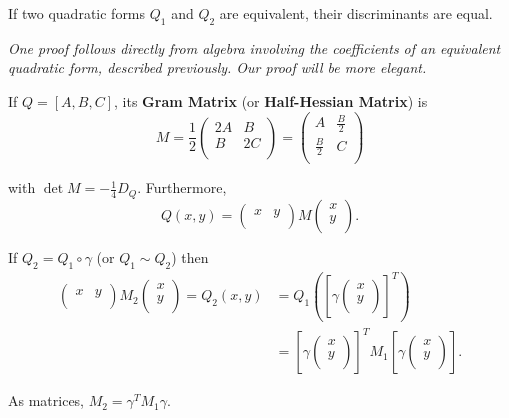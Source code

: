 \documentclass[11pt]{article}
\begin{document}
\begin{theorem}\label{determinant_equivalent_quad_forms}
If two quadratic forms $Q_1$ and $Q_2$ are equivalent, their discriminants are equal.
\end{theorem}

\textit{One proof follows directly from algebra involving the coefficients of an equivalent quadratic form, described previously. Our proof will be more elegant.}

\begin{definition}
If $Q = [A, B, C]$, its \textbf{Gram Matrix} (or \textbf{Half-Hessian Matrix}) is
\[
    M = \frac{1}{2} \begin{pmatrix}
        2A & B  \\
        B & 2C  \\
    \end{pmatrix} =
    \begin{pmatrix}
        A & \frac{B}{2}  \\
        \frac{B}{2} & C  \\
    \end{pmatrix}
\]

with $\det M = -\frac{1}{4} D_Q$. Furthermore,
\[
    Q(x, y) = \begin{pmatrix}
        x & y  \\
    \end{pmatrix} M \begin{pmatrix}
        x \\
        y \\
    \end{pmatrix}.
\]
\end{definition}

\begin{remark}
If $Q_2 = Q_1 \circ \gamma$ (or $Q_1 \sim Q_2$) then 
\begin{align*}
    \begin{pmatrix}
        x & y  \\
    \end{pmatrix} M_2 \begin{pmatrix}
        x \\
        y \\
    \end{pmatrix} = Q_2(x,y) &= Q_1\left(\left[\gamma
    \begin{pmatrix}
        x \\
        y \\
    \end{pmatrix}\right]^T\right) \\
    &= \left[\gamma
    \begin{pmatrix}
        x \\
        y \\
    \end{pmatrix}\right]^T
    M_1
    \left[\gamma
    \begin{pmatrix}
        x \\
        y \\
    \end{pmatrix}\right].
\end{align*}

As matrices, $M_2 = \gamma^T M_1 \gamma$.
\end{remark}
\end{document}
